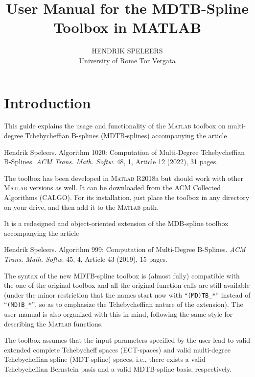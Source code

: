 \documentclass[10pt]{acmtrans2e}
\title{User Manual for the MDTB-Spline Toolbox in {MATLAB}}
\author{HENDRIK SPELEERS\\University of Rome Tor Vergata}
\newcommand{\Matlab}{\textsc{Matlab}}
\begin{document}
\maketitle

\vspace*{-0.5cm}

\section{Introduction}

This guide explains the usage and functionality of the \Matlab{} toolbox on multi-degree Tchebycheffian B-splines (MDTB-splines) accompanying the article

\begin{center}
\begin{minipage}{0.90\textwidth}
Hendrik Speleers. Algorithm 1020: Computation of Multi-Degree Tchebycheffian B-Splines. \emph{ACM Trans. Math. Softw.} 48, 1, Article 12 (2022), 31 pages.
\end{minipage}
\end{center}

\noindent The toolbox has been developed in \Matlab{} R2018a but should work with other \Matlab{} versions as well. It can be downloaded from the ACM Collected Algorithms (CALGO). For its installation, just place the toolbox in any directory on your drive, and then add it to the \Matlab{} path.

It is a redesigned and object-oriented extension of the MDB-spline toolbox accompanying the article

\begin{center}
\begin{minipage}{0.90\textwidth}
Hendrik Speleers. Algorithm 999: Computation of Multi-Degree B-Splines. \emph{ACM Trans. Math. Softw.} 45, 4, Article 43 (2019), 15 pages.
\end{minipage}
\end{center}

\noindent The syntax of the new MDTB-spline toolbox is (almost fully) compatible with the one of the original toolbox and all the original function calls are still available (under the minor restriction that the names start now with ``\texttt{(MD)TB\_*}'' instead of ``\texttt{(MD)B\_*}'', so as to emphasize the Tchebycheffian nature of the extension). The user manual is also organized with this in mind, following the same style for describing the \Matlab{} functions.

The toolbox assumes that the input parameters specified by the user lead to valid extended complete Tchebycheff spaces (ECT-spaces) and valid multi-degree Tchebycheffian spline (MDT-spline) spaces, i.e., there exists a valid Tchebycheffian Bernstein basis and a valid MDTB-spline basis, respectively.
\end{document}
